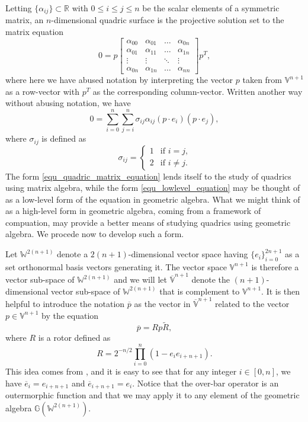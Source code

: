 \documentclass{ecgd-l}
\theoremstyle{definition}
\theoremstyle{remark}
\numberwithin{equation}{section}
\newcommand{\G}{\mathbb{G}}
\newcommand{\V}{\mathbb{V}}
\newcommand{\Vb}{\mathbb{\overline{V}}}
\newcommand{\W}{\mathbb{W}}
\newcommand{\R}{\mathbb{R}}
\begin{document}
Letting $\{\alpha_{ij}\}\subset\R$ with $0\leq i\leq j\leq n$ be the scalar elements of a symmetric
matrix, an $n$-dimensional quadric surface is the projective solution set to the
matrix equation
\begin{equation}\label{equ_quadric_matrix_equation}
0 = p\left[\begin{array}{cccc}
\alpha_{00} & \alpha_{01} & \dots & \alpha_{0n} \\
\alpha_{01} & \alpha_{11} & \dots & \alpha_{1n} \\
\vdots & \vdots & \ddots & \vdots \\
\alpha_{0n} & \alpha_{1n} & \dots & \alpha_{nn}
\end{array}\right]p^T,
\end{equation}
where here we have abused notation by interpreting the vector $p$ taken from $\V^{n+1}$ as
a row-vector with $p^T$ as the corresponding column-vector.  Written another
way without abusing notation, we have
\begin{equation}\label{equ_lowlevel_equation}
0 = \sum_{i=0}^n\sum_{j=i}^n\sigma_{ij}\alpha_{ij}(p\cdot e_i)(p\cdot e_j),
\end{equation}
where $\sigma_{ij}$ is defined as
\begin{equation}
\sigma_{ij} = \left\{\begin{array}{ll}
1 & \mbox{if $i=j$,} \\
2 & \mbox{if $i\neq j$.}
\end{array}\right.
\end{equation}
The form \eqref{equ_quadric_matrix_equation} lends itself to the study
of quadrics using matrix algebra, while the form \eqref{equ_lowlevel_equation}
may be thought of as a low-level form of the equation in geometric algebra.
What we might think of as a high-level form in geometric algebra, coming from
a framework of compuation, may provide a better means of studying quadrics
using geometric algebra.  We procede now to develop such a form.

Let $\W^{2(n+1)}$ denote a $2(n+1)$-dimensional vector space
having $\{e_i\}_{i=0}^{2n+1}$ as a set orthonormal basis vectors
generating it.  The vector space $\V^{n+1}$ is therefore a vector
sub-space of $\W^{2(n+1)}$ and we will let $\Vb^{n+1}$ denote
the $(n+1)$-dimensional vector sub-space of $\W^{2(n+1)}$ that
is complement to $\V^{n+1}$.  It is then helpful to introduce the
notation $\overline{p}$ as the vector in $\Vb^{n+1}$ related to the
vector $p\in\V^{n+1}$ by the equation
\begin{equation}
\overline{p} = Rp\tilde{R},
\end{equation}
where $R$ is a rotor defined as
\begin{equation}
R = 2^{-n/2}\prod_{i=0}^n\left(1-e_ie_{i+n+1}\right).
\end{equation}
This idea comes from \cite{DoranHestenes93}, and it is easy to see
that for any integer $i\in[0,n]$, we have $\overline{e}_i=e_{i+n+1}$
and $\overline{e}_{i+n+1}=e_i$.  Notice that the over-bar operator
is an outermorphic function and that we may apply it to any element
of the geometric algebra $\G(\W^{2(n+1)})$.
\end{document}
